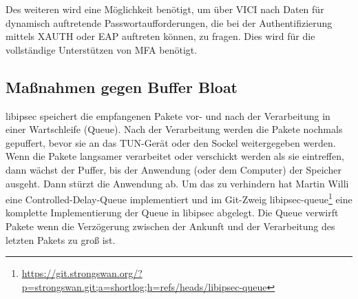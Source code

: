 Des weiteren wird eine Möglichkeit benötigt, um über \ac{VICI} nach Daten für dynamisch auftretende
Passwortaufforderungen, die bei der Authentifizierung mittels XAUTH oder EAP auftreten können,
zu fragen. Dies wird für die vollständige Unterstützen von \ac{MFA} benötigt.


\subsection{Maßnahmen gegen Buffer Bloat}
libipsec speichert die empfangenen Pakete vor- und nach der Verarbeitung in einer 
Wartschleife (Queue).
Nach der Verarbeitung werden die Pakete nochmals gepuffert, bevor sie an das TUN-Gerät 
oder den Sockel
weitergegeben werden. Wenn die Pakete langsamer verarbeitet oder verschickt werden 
als sie eintreffen,
dann wächst der Puffer, bis der Anwendung (oder dem Computer) der Speicher ausgeht. 
Dann stürzt die Anwendung ab.
Um das zu verhindern hat Martin Willi eine Controlled-Delay-Queue implementiert und 
im Git-Zweig libipsec-queue\footnote{\url{https://git.strongswan.org/?p=strongswan.git;a=shortlog;h=refs/heads/libipsec-queue}} 
eine komplette Implementierung der Queue in libipsec abgelegt.
Die Queue verwirft Pakete wenn die Verzögerung zwischen der Ankunft und der Verarbeitung
des letzten Pakets zu groß ist.
